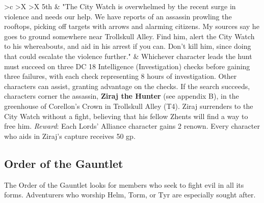 \documentclass[10pt,a4paper,twoside,twocolumn,openany,nodeprecatedcode]{dndbook}
\begin{document}
\begin{DndTable}{>{\hsize}c >{\hsize}X >{\hsize}X}
5th & "The City Watch is overwhelmed by the recent surge in violence and needs our help. We have reports of an assassin prowling the rooftops, picking off targets with arrows and alarming citizens. My sources say he goes to ground somewhere near Trollskull Alley. Find him, alert the City Watch to his whereabouts, and aid in his arrest if you can. Don't kill him, since doing that could escalate the violence further." & Whichever character leads the hunt must succeed on three DC 18 Intelligence (Investigation) checks before gaining three failures, with each check representing 8 hours of investigation. Other characters can assist, granting advantage on the checks. If the search succeeds, characters corner the assassin, \textbf{Ziraj the Hunter} (see appendix B), in the greenhouse of Corellon's Crown in Trollskull Alley (T4). Ziraj surrenders to the City Watch without a fight, believing that his fellow Zhents will find a way to free him. \textit{Reward}: Each Lords' Alliance character gains 2 renown. Every character who aids in Ziraj's capture receives 50 gp.\\
\end{DndTable}


\subsection{Order of the Gauntlet}
The Order of the Gauntlet looks for members who seek to fight evil in all its forms. Adventurers who worship Helm, Torm, or Tyr are especially sought after.
\end{document}

